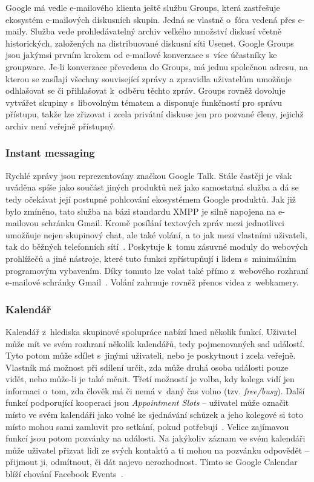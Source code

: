 \documentclass[12pt,oneside,final]{fithesis2}
\begin{document}
Google má vedle e-mailového klienta ještě službu Groups, která zastřešuje ekosystém e-mailových diskusních skupin. Jedná se vlastně o~fóra vedená přes e-maily. Služba vede prohledávatelný archiv velkého množství diskusí včetně historických, založených na distribuované diskusní síti Usenet. Google Groups jsou jakýmsi prvním krokem od e-mailové konverzace s~více účastníky ke groupware. Je-li konverzace převedena do Groups, má jednu společnou adresu, na kterou se zasílají všechny související zprávy a zpravidla uživatelům umožňuje odhlašovat se či přihlašovat k~odběru těchto zpráv. Groups rovněž dovoluje vytvářet skupiny s~libovolným tématem a disponuje funkčností pro správu přístupu, takže lze zřizovat i zcela privátní diskuse jen pro pozvané členy, jejichž archiv není veřejně přístupný.

\subsubsection*{Instant messaging}
Rychlé zprávy jsou reprezentovány značkou Google Talk. Stále častěji je však uváděna spíše jako součást jiných produktů než jako samostatná služba a dá se tedy očekávat její postupné pohlcování ekosystémem Google produktů. Jak již bylo zmíněno, tato služba na bázi standardu XMPP je silně napojena na e-mai\-lo\-vou schrán\-ku Gmail. Kromě posílání textových zpráv mezi jednotlivci umožňuje nejen skupinový chat, ale také volání, a to jak mezi vlastními uživateli, tak do běžných telefonních sítí~\cite{teague2010making}. Poskytuje k~tomu zásuvné moduly do webových prohlížečů a jiné nástroje, které tuto funkci zpřístupňují i lidem s~minimálním programovým vybavením. Díky tomuto lze volat také přímo z~webového rozhraní e-mailové schránky Gmail~\cite{schriebman2010call}. Volání zahrnuje rovněž přenos videa z~webkamery.

\subsubsection*{Kalendář}
Kalendář z~hlediska skupinové spolupráce nabízí hned několik funkcí. Uživatel může mít ve svém rozhraní několik kalendářů, tedy pojmenovaných sad událostí. Tyto potom může sdílet s~jinými uživateli, nebo je poskytnout i zcela veřejně. Vlastník má možnost při sdílení určit, zda může druhá osoba události pouze vidět, nebo může-li je také měnit. Třetí možností je volba, kdy kolega vidí jen informaci o~tom, zda člověk má či nemá v~daný čas volno (tzv. \emph{free/busy}). Další funkcí podporující kooperaci jsou \emph{Appointment Slots} -- uživatel může označit místo ve svém kalendáři jako volné ke sjednávání schůzek a jeho kolegové si toto místo mohou sami zamluvit pro setkání, pokud potřebují~\cite{chung2010introducing}. Velice zajímavou funkcí jsou potom pozvánky na události. Na jakýkoliv záznam ve svém kalendáři může uživatel přizvat lidi ze svých kontaktů a ti mohou na pozvánku odpovědět -- přijmout ji, odmítnout, či dát najevo nerozhodnost. Tímto se Google Calendar blíží chování Facebook Events~\cite{florescu2010insert}.
\end{document}
